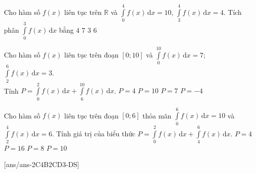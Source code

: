 \begin{ex}%
	Cho hàm số $f(x)$ liên tục trên $\mathbb{R}$ và $\displaystyle\int\limits_0^4f(x)\mathrm{\,d}x=10$, $\displaystyle\int\limits_3^4f(x)\mathrm{\,d}x=4$. Tích phân $\displaystyle\int\limits_0^3f(x)\mathrm{\,d}x$ bằng
	\choice
	{$4$}
	{$7$}
	{$3$}
	{\True $6$}
\end{ex}
\begin{ex}%
	Cho hàm số $f(x)$ liên tục trên đoạn $[0;10]$ và $\displaystyle\int\limits_0^{10}f(x)\mathrm{\,d}x=7$; $\displaystyle\int\limits_2^6f(x)\mathrm{\,d}x=3$.\\
	Tính $P=\displaystyle\int\limits_0^2f(x)\mathrm{\,d}x+\displaystyle\int\limits_6^{10}f(x)\mathrm{\,d}x$.
	\choice
	{\True $P=4$}
	{$P=10$}
	{$P=7$}
	{$P=-4$}
\end{ex}
\begin{ex}%
	Cho hàm số $f(x)$ liên tục trên đoạn $[0; 6]$ thỏa mãn $\displaystyle\int\limits_0^6f(x)\mathrm{\,d}x=10$ và $\displaystyle\int\limits_2^4f(x)\mathrm{\,d}x=6$. 	Tính giá trị của biểu thức $P=\displaystyle\int\limits_0^2f(x)\mathrm{\,d}x+\displaystyle\int\limits_4^6f(x)\mathrm{\,d}x$.
	\choice
	{\True$P=4$}
	{$P=16$}
	{$P=8$}
	{$P=10$}
\end{ex}
\TNTF
{}[ans/ans-2C4B2CD3-DS]

